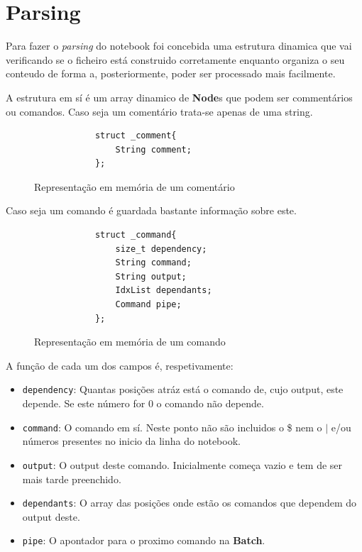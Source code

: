 \documentclass[12pt,a4paper]{report}
\begin{document}
\chapter{Parsing}
    Para fazer o \textit{parsing} do notebook foi concebida uma estrutura
    dinamica que vai verificando se o ficheiro está construido corretamente
    enquanto organiza o seu conteudo de forma a, posteriormente, poder ser
    processado mais facilmente.

    A estrutura em sí é um array dinamico de \textbf{Node}s que podem ser
    commentários ou comandos. Caso seja um comentário trata-se apenas de
    uma string.
    \begin{figure}[h]
        \centering
        \begin{verbatim}
            struct _comment{
                String comment;
            };
        \end{verbatim}
        \caption{Representação em memória de um comentário}
        \label{fig:commentStruct}
    \end{figure}

    Caso seja um comando é guardada bastante informação sobre este.
    \begin{figure}[h]
        \centering
        \begin{verbatim}
            struct _command{
                size_t dependency;
                String command;
                String output;
                IdxList dependants;
                Command pipe;
            };
        \end{verbatim}
        \caption{Representação em memória de um comando}
    \end{figure}

    A função de cada um dos campos é, respetivamente:
    \begin{itemize}
        \item \texttt{dependency}: Quantas posições atráz está o comando
            de, cujo output, este depende. Se este número for 0 o comando não
            depende.

        \item \texttt{command}: O comando em sí. Neste ponto não são
            incluidos o \$ nem o $|$ e/ou números presentes no inicio da linha
            do notebook.

        \item \texttt{output}: O output deste comando. Inicialmente
            começa vazio e tem de ser mais tarde preenchido.

        \item \texttt{dependants}: O array das posições onde estão os
            comandos que dependem do output deste.

        \item \texttt{pipe}: O apontador para o proximo comando na
            \textbf{Batch}.
    \end{itemize}
\end{document}
